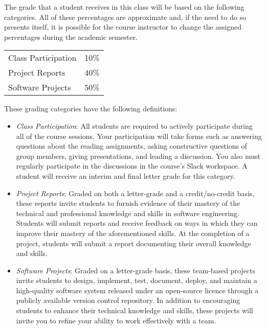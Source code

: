 \documentclass[11pt]{article}
\begin{document}
The grade that a student receives in this class will be based on the following
categories. All of these percentages are approximate and, if the need to do so
presents itself, it is possible for the course instructor to change the assigned
percentages during the academic semester.

\renewcommand{\arraystretch}{1.2}

\begin{center}
  \begin{tabular}{ll}
    Class Participation        & 10\%  \\
    Project Reports            & 40\% \\
    Software Projects          & 50\%
  \end{tabular}
\end{center}

\noindent
These grading categories have the following definitions:

\vspace*{-.05in}

\begin{itemize}

  \item {\em Class Participation\/}: All students are required to actively
    participate during all of the course sessions. Your participation will take
    forms such as answering questions about the reading assignments, asking
    constructive questions of group members, giving presentations, and leading a
    discussion. You also must regularly participate in the discussions in the
    course's Slack workspace. A student will receive an interim and final letter
    grade for this category.

  \item {\em Project Reports\/}: Graded on both a letter-grade and a
    credit/no-credit basis, these reports invite students to furnish evidence of
    their mastery of the technical and professional knowledge and skills in
    software engineering. Students will submit reports and receive feedback on
    ways in which they can improve their mastery of the aforementioned skills.
    At the completion of a project, students will submit a report documenting
    their overall knowledge and skills.

  \item {\em Software Projects\/}: Graded on a letter-grade basis, these
    team-based projects invite students to design, implement, test, document,
    deploy, and maintain a high-quality software system released under an
    open-source licence through a publicly available version control repository.
    In addition to encouraging students to enhance their technical knowledge and
    skills, these projects will invite you to refine your ability to work
    effectively with a team.

\end{itemize}
\end{document}
